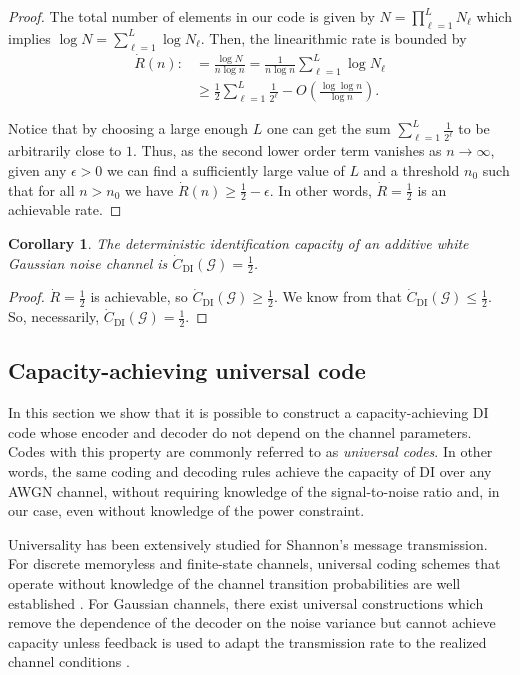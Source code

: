 \documentclass[10pt,conference]{IEEEtran}
\newtheorem{corollary}[theorem]{Corollary}
\newcommand{\1}{\mathds{1}}
\newcommand{\cG}{\mathcal{G}}
\begin{document}
\begin{proof}
The total number of elements in our code is given by $N=\prod_{\ell=1}^{L}N_{\ell}$ which implies $\log N=\sum_{\ell=1}^{L}\log N_{\ell}$. Then, the linearithmic rate is bounded by
\begin{equation}\label{eq:proof_rate}
\begin{split}
\dot R (n):&=\frac{\log N}{n\log n}=\frac{1}{n\log n}\sum_{\ell=1}^{L}\log N_\ell\\
&\geq\frac12\sum_{\ell=1}^{L}\frac{1}{2^\ell}-O\left(\frac{\log\log n}{\log n}\right).
\end{split}
\end{equation}

Notice that by choosing a large enough $L$ one can get the sum $\sum_{\ell=1}^{L}\frac{1}{2^\ell}$ to be arbitrarily close to $1$. Thus, as the second lower order term vanishes as $n\to\infty$, given any $\epsilon>0$ we can find a sufficiently large value of $L$ and a threshold $n_0$ such that for all $n>n_0$ we have $\dot R(n)\geq\frac12-\epsilon$. In other words, $\dot R=\frac12$ is an achievable rate.
\end{proof}

\begin{corollary}\label{cor:capacity}
The deterministic identification capacity of an additive white Gaussian noise channel is $\dot{C}_\text{DI}(\cG)=\frac12$.
\end{corollary}
\begin{proof}
$\dot R=\frac12$ is achievable, so $\dot{C}_\text{DI}(\cG)\geq\frac12$. We know from \cite{DI-fading,RRGauss-arXiv} that $\dot{C}_\text{DI}(\cG)\leq\frac12$. So, necessarily, $\dot{C}_\text{DI}(\cG)=\frac12$.
\end{proof}

\subsection{Capacity-achieving universal code}\label{ssec:universal}
In this section we show that it is possible to construct a capacity-achieving DI code whose encoder and decoder do not depend on the channel parameters. Codes with this property are commonly referred to as \emph{universal codes}. In other words, the same coding and decoding rules achieve the capacity of DI over any AWGN channel, without requiring knowledge of the signal-to-noise ratio and, in our case, even without knowledge of the power constraint.

Universality has been extensively studied for Shannon's message transmission. For discrete memoryless and finite-state channels, universal coding schemes that operate without knowledge of the channel transition probabilities are well established \cite{CK:book2011,Ziv-universal}. For Gaussian channels, there exist universal constructions which remove the dependence of the decoder on the noise variance but cannot achieve capacity \cite{LN:General-universal,Gaussian-universal} unless feedback is used to adapt the transmission rate to the realized channel conditions \cite{rateless-codes}.
\end{document}
